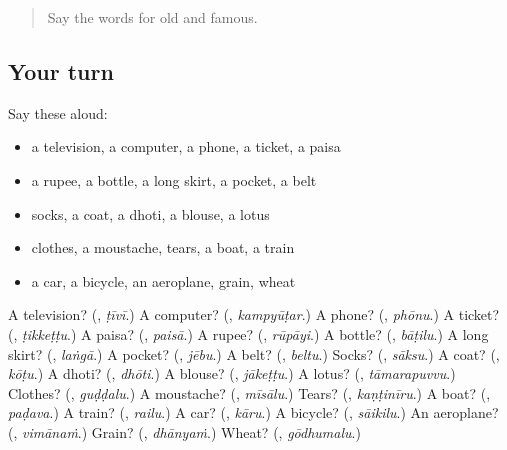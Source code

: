 \label{lesson:TE-R139-first-pass-animals-the-body-and-more-things}



\begin{quote}
Say the words for old and famous.
\end{quote}

\subsection*{Your turn}
Say these aloud:

\begin{itemize}
\raggedright
  \item a television, a computer, a phone, a ticket, a paisa
  \item a rupee, a bottle, a long skirt, a pocket, a belt
  \item socks, a coat, a dhoti, a blouse, a lotus
  \item clothes, a moustache, tears, a boat, a train
  \item a car, a bicycle, an aeroplane, grain, wheat
\end{itemize}

\begin{tcolorbox}[breakable,colback=teal!4,colframe=teal!35!black,title={Before you move on}]
A television? (\textbf{}, \emph{ṭīvī}.) A computer? (\textbf{}, \emph{kampyūṭar}.) A phone? (\textbf{}, \emph{phōnu}.) A ticket? (\textbf{}, \emph{ṭikkeṭṭu}.) A paisa? (\textbf{}, \emph{paisā}.) A rupee? (\textbf{}, \emph{rūpāyi}.) A bottle? (\textbf{}, \emph{bāṭilu}.) A long skirt? (\textbf{}, \emph{laṅgā}.) A pocket? (\textbf{}, \emph{jēbu}.) A belt? (\textbf{}, \emph{beltu}.) Socks? (\textbf{}, \emph{sāksu}.) A coat? (\textbf{}, \emph{kōṭu}.) A dhoti? (\textbf{}, \emph{dhōti}.) A blouse? (\textbf{}, \emph{jākeṭṭu}.) A lotus? (\textbf{}, \emph{tāmarapuvvu}.) Clothes? (\textbf{}, \emph{guḍḍalu}.) A moustache? (\textbf{}, \emph{mīsālu}.) Tears? (\textbf{}, \emph{kaṇṭinīru}.) A boat? (\textbf{}, \emph{paḍava}.) A train? (\textbf{}, \emph{railu}.) A car? (\textbf{}, \emph{kāru}.) A bicycle? (\textbf{}, \emph{sāikilu}.) An aeroplane? (\textbf{}, \emph{vimānaṁ}.) Grain? (\textbf{}, \emph{dhānyaṁ}.) Wheat? (\textbf{}, \emph{gōdhumalu}.)
\end{tcolorbox}
